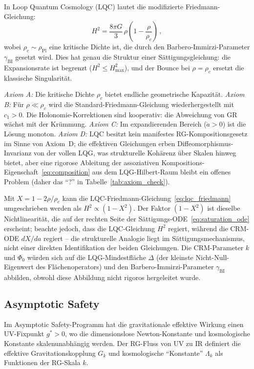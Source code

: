 \documentclass[aps,prd,twocolumn,superscriptaddress,nofootinbib]{revtex4-2}
\begin{document}
In Loop Quantum Cosmology (LQC) \cite{Ashtekar2006,Bojowald2008} lautet die modifizierte Friedmann-Gleichung:
\begin{equation}
H^2 = \frac{8\pi G}{3}\,\rho\!\left(1 - \frac{\rho}{\rho_c}\right)\,,
\label{eq:lqc_friedmann}
\end{equation}
wobei $\rho_c \sim \rho_{\mathrm{Pl}}$ eine kritische Dichte ist, die durch den Barbero-Immirzi-Parameter $\gamma_{\mathrm{BI}}$ gesetzt wird. Dies hat genau die Struktur einer Sättigungsgleichung: die Expansionsrate ist begrenzt ($H^2 \leq H_{\max}^2$), und der Bounce bei $\rho = \rho_c$ ersetzt die klassische Singularität.

\textit{Axiom A:} Die kritische Dichte $\rho_c$ bietet endliche geometrische Kapazität. \textit{Axiom B:} Für $\rho \ll \rho_c$ wird die Standard-Friedmann-Gleichung wiederhergestellt mit $c_1 > 0$. Die Holonomie-Korrektionen sind kooperativ: die Abweichung von GR wächst mit der Krümmung. \textit{Axiom C:} Im expandierenden Bereich ($\dot{a} > 0$) ist die Lösung monoton. \textit{Axiom D:} LQC besitzt kein manifestes RG-Kompositionsgesetz im Sinne von Axiom~D; die effektiven Gleichungen erben Diffeomorphismus-Invarianz von der vollen LQG, was strukturelle Kohärenz über Skalen hinweg bietet, aber eine rigorose Ableitung der assoziativen Kompositions-Eigenschaft~\eqref{eq:composition} aus dem LQG-Hilbert-Raum bleibt ein offenes Problem (daher das ``?'' in Tabelle~\ref{tab:axiom_check}).

Mit $X = 1 - 2\rho/\rho_c$ kann die LQC-Friedmann-Gleichung~\eqref{eq:lqc_friedmann} umgeschrieben werden als $H^2 \propto (1 - X^2)$. Der Faktor $(1-X^2)$ ist dieselbe Nichtlinearität, die auf der rechten Seite der Sättigungs-ODE~\eqref{eq:saturation_ode} erscheint; beachte jedoch, dass die LQC-Gleichung $H^2$ regiert, während die CRM-ODE $dX/da$ regiert -- die strukturelle Analogie liegt im Sättigungsmechanismus, nicht einer direkten Identifikation der beiden Gleichungen. Die CRM-Parameter $k$ und $\Phi_0$ würden sich auf die LQG-Mindestfläche $\Delta$ (der kleinste Nicht-Null-Eigenwert des Flächenoperators) und den Barbero-Immirzi-Parameter $\gamma_{\mathrm{BI}}$ abbilden, obwohl diese Abbildung nicht rigoros hergeleitet wurde.

\subsection{Asymptotic Safety}

Im Asymptotic Safety-Programm \cite{Weinberg1979,Reuter1998,Percacci2017} hat die gravitationale effektive Wirkung einen UV-Fixpunkt $g^* > 0$, wo die dimensionslose Newton-Konstante und kosmologische Konstante skalenunabhängig werden. Der RG-Fluss von UV zu IR definiert die effektive Gravitationskopplung $G_k$ und kosmologische ``Konstante'' $\Lambda_k$ als Funktionen der RG-Skala $k$.
\end{document}
